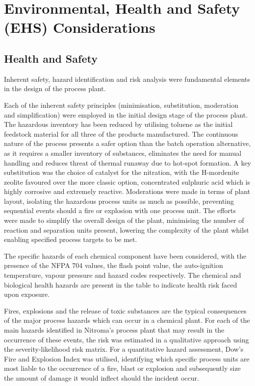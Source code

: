 \section{Environmental, Health and Safety (EHS) Considerations}
\label{sec:ehs}
\subsection{Health and Safety}

Inherent safety, hazard identification and risk analysis were fundamental elements in the design of the process plant. 

Each of the inherent safety principles (minimisation, substitution, moderation and simplification) were employed in the initial design stage of the process plant. The hazardous inventory has been reduced by utilising toluene as the initial feedstock material for all three of the products manufactured. The continuous nature of the process presents a safer option than the batch operation alternative, as it requires a smaller inventory of substances, eliminates the need for manual handling and reduces threat of thermal runaway due to hot-spot formation. A key substitution was the choice of catalyst for the nitration, with the H-mordenite zeolite favoured over the more classic option, concentrated sulphuric acid which is highly corrosive and extremely reactive. Moderations were made in terms of plant layout, isolating the hazardous process units as much as possible, preventing sequential events should a fire or explosion with one process unit. The efforts were made to simplify the overall design of the plant, minimising the number of reaction and separation units present, lowering the complexity of the plant whilst enabling specified process targets to be met. 

The specific hazards of each chemical component have been considered, with the presence of the NFPA 704 values, the flash point value, the auto-ignition temperature, vapour pressure and hazard codes respectively. The chemical and biological health hazards are present in the table to indicate health risk faced upon exposure.  

Fires, explosions and the release of toxic substances are the typical consequences of the major process hazards which can occur in a chemical plant.  %
For each of the main hazards identified in Nitroma's process plant that may result in the occurrence of these events, the risk was estimated in a qualitative approach using the severity-likelihood risk matrix. For a quantitative hazard assessment, Dow's Fire and Explosion Index was utilised, identifying which specific process units are most liable to the occurrence of a fire, blast or explosion and subsequently size the amount of damage it would inflect should the incident occur. 

